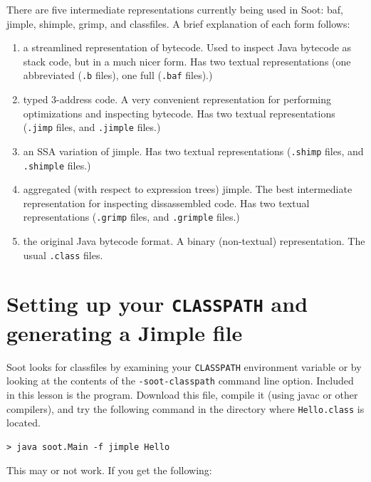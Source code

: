 \documentclass{article}
\begin{document}
There are five intermediate representations currently being used in Soot: baf,
jimple, shimple, grimp, and classfiles.  A brief explanation of each form
follows:

\begin{enumerate}
\item[baf] a streamlined representation of bytecode.  Used to inspect Java
bytecode as stack code, but in a much nicer form.  Has two textual
representations (one abbreviated ({\tt .b} files), one full ({\tt .baf} 
files).)

\item[jimple] typed 3-address code.  A very convenient representation
for performing optimizations and inspecting bytecode.  Has two textual
representations ({\tt .jimp} files, and {\tt .jimple} files.)

\item[shimple] an SSA variation of jimple. Has two textual
representations ({\tt .shimp} files, and {\tt .shimple} files.)

\item[grimp] aggregated (with respect to expression trees) jimple.  The best
intermediate representation for inspecting dissassembled code. Has two textual
representations ({\tt .grimp} files, and {\tt .grimple} files.)

\item[classfiles] the original Java bytecode format.  A binary (non-textual)
representation.  The usual {\tt .class} files.
\end{enumerate}

\section{Setting up your {\tt CLASSPATH} and generating a Jimple file}

Soot looks for classfiles by examining your {\tt CLASSPATH} environment
variable or by looking at the contents of the {\tt -soot-classpath} command
line option.  Included in this lesson is the {} program.
Download this file, compile it (using javac or other compilers), and try the following
command in the directory where {\tt Hello.class} is located.

\begin{verbatim}
> java soot.Main -f jimple Hello
\end{verbatim}

This may or not work.  If you get the following:
\end{document}
